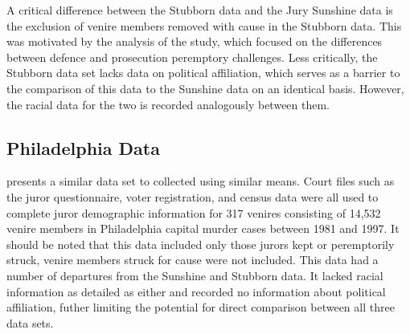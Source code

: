 A critical difference between the Stubborn data and the Jury Sunshine data is the exclusion of venire members removed with cause in the Stubborn data. This was motivated by the analysis of the study, which focused on the differences between defence and prosecution peremptory challenges. Less critically, the Stubborn data set lacks data on political affiliation, which serves as a barrier to the comparison of this data to the Sunshine data on an identical basis. However, the racial data for the two is recorded analogously between them.

\subsection{Philadelphia Data} \label{sec:phillydata}

\cite{PerempChalMurder} presents a similar data set to \cite{StubbornLegacy} collected using similar means. Court files such as
the juror questionnaire, voter registration, and census data were all used to complete juror demographic information for 317
venires consisting of 14,532 venire members in Philadelphia capital murder cases between 1981 and 1997. It should be noted that this data included only those
jurors kept or peremptorily struck, venire members struck for cause were not included. This data had a number of departures from the Sunshine and Stubborn data. It lacked racial information as detailed as either and recorded no information about political affiliation, futher limiting the potential for direct comparison between all three data sets.